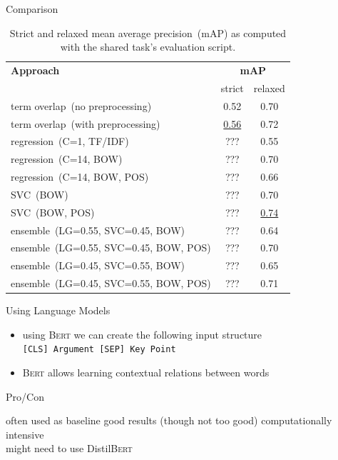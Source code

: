 \documentclass[english,handout]{mlutalk}
\newcommand{\Bert}{\textsc{Bert}\xspace}
\newcommand{\DistilBert}{Distil\textsc{Bert}\xspace}
\newcommand{\TFIDF}{\mbox{TF/IDF}\xspace}
\newcommand{\mAP}{\mbox{mAP}\xspace}
\begin{document}
\begin{frame}{Comparison}
  \begin{table}
    \centering
    \caption{Strict and relaxed mean average precision~(\mAP) as computed with the shared task's evaluation script.}
    \begin{tabular}{lcc}
      \toprule
      \textbf{Approach} & \multicolumn{2}{c}{\textbf{\mAP}} \\
      & strict & relaxed \\
      \midrule
      term overlap~(no preprocessing) & 0.52 & 0.70 \\
      term overlap~(with preprocessing) & \underline{0.56} & 0.72 \\
      regression~(C=1, \TFIDF) & ??? & 0.55 \\
      regression~(C=14, BOW) & ??? & 0.70 \\
      regression~(C=14, BOW, POS) & ??? & 0.66 \\
      SVC~(BOW) & ??? & 0.70 \\
      SVC~(BOW, POS) & ??? & \underline{0.74} \\
      ensemble~(LG=0.55, SVC=0.45, BOW) & ??? & 0.64 \\
      ensemble~(LG=0.55, SVC=0.45, BOW, POS) & ??? & 0.70 \\
      ensemble~(LG=0.45, SVC=0.55, BOW) & ??? & 0.65 \\
      ensemble~(LG=0.45, SVC=0.55, BOW, POS) & ??? & 0.71 \\
      \bottomrule
    \end{tabular}
  \end{table}
\end{frame}

\begin{frame}{Using Language Models}

  \begin{itemize}
    \item using \Bert we can create the following input structure \\
    \lstinline{[CLS] Argument [SEP] Key Point}
    \item \Bert allows learning contextual relations between words
  \end{itemize}

  \begin{block}{Pro/Con}
    \begin{itemize}
      \pro often used as baseline
      \pro good results (though not too good)
      \con computationally intensive \\ might need to use \DistilBert
    \end{itemize}
  \end{block}

\end{frame}
\end{document}
